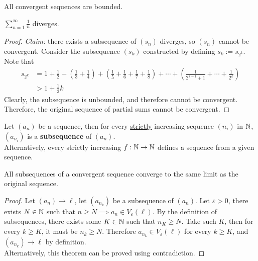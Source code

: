 \documentclass[11pt]{article}
\begin{document}
	\begin{lemma}
		All convergent sequences are bounded.
	\end{lemma}
	
	\begin{example}
		$\sum_{n=1}^\infty \frac{1}{n}$ diverges.
	\end{example}
	
	\begin{proof}
		\emph{Claim:} there exists a subsequence of $(s_n)$ diverges, so $(s_n)$ cannot be convergent. Consider the subsequence $(s_k)$ constructed by defining $s_k := s_{2^k}$. Note that
		\begin{align}
			s_{2^k} &= 1 + \frac{1}{2} + 
			\left(
			\frac{1}{3} + \frac{1}{4}
			\right) +
			\left(
			\frac{1}{5} + \frac{1}{6} + \frac{1}{7} + \frac{1}{8}
			\right) +
			\cdots +
			\left(
			\frac{1}{2^{k-1} + 1} + \cdots + \frac{1}{2^k}
			\right) \\
			&> 1 + \frac{1}{2} k
		\end{align}
		Clearly, the subsequence is unbounded, and therefore cannot be convergent. Therefore, the original sequence of partial sums cannot be convergent. 
	\end{proof}
	
	\begin{definition}
		Let $(a_n)$ be a sequence, then for every \ul{strictly} increasing sequence $(n_i)$ in $\mathbb{N}$, $(a_{n_i})$ is a \textbf{subsequence} of $(a_n)$. \\
		Alternatively, every strictly increasing $f: \mathbb{N} \to \mathbb{N}$ defines a sequence from a given sequence.
	\end{definition}
	
	\begin{theorem}
		All subsequences of a convergent sequence converge to the same limit as the original sequence.
	\end{theorem}
	
	\begin{proof}
		Let $(a_n) \to \ell$, let $(a_{n_k})$ be a subsequence of $(a_n)$. Let $\varepsilon > 0$, there exists $N \in \mathbb{N}$ such that $n \geq N \implies a_n \in V_\varepsilon(\ell)$. By the definition of subsequences, there exists some $K \in \mathbb{N}$ such that $n_K \geq N$. Take such $K$, then for every $k \geq K$, it must be $n_k \geq N$. Therefore $a_{n_k} \in V_\varepsilon(\ell)$ for every $k \geq K$, and $(a_{n_k}) \to \ell$ by definition. \\
		Alternatively, this theorem can be proved using contradiction.
	\end{proof}
	
\end{document}
